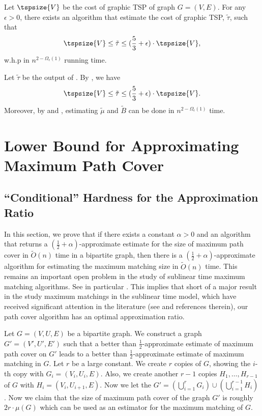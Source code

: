 \begin{theorem}\label{thm: graphic-tsp3}
Let $\tspsize{V}$ be the cost of graphic TSP of graph $G = (V, E)$. For any $\epsilon > 0$, there exists an algorithm that estimate the cost of graphic TSP, $\tilde{\tau}$, such that
$$
\tspsize{V} \leq \tilde{\tau} \leq (\frac{5}{3} + \epsilon) \cdot \tspsize{V},
$$
w.h.p in $n^{2-\Omega_\epsilon(1)}$ running time. \vspace{3px}
\end{theorem}
\begin{myproof}
Let $\tilde{\tau}$ be the output of . By , we have 
$$
\tspsize{V} \leq \tilde{\tau} \leq (\frac{5}{3} + \epsilon) \cdot \tspsize{V}.
$$
Moreover, by  and , estimating $\tilde{\mu}$ and $\tilde{B}$ can be done in $n^{2-\Omega_\epsilon(1)}$ time.
\end{myproof}





\section{Lower Bound for Approximating Maximum Path Cover}\label{sec:lowerbound}


\subsection{``Conditional'' Hardness for the Approximation Ratio}
In this section, we prove that if there exists a constant $\alpha > 0$ and an algorithm that returns a $(\frac{1}{2} + \alpha)$-approximate estimate for the size of maximum path cover in $\tilde{O}(n)$ time in a bipartite graph, then there is a $(\frac{1}{2} + \alpha)$-approximate algorithm for estimating the maximum matching size in $\tilde{O}(n)$ time. This remains an important open problem in the study of sublinear time maximum matching algorithms. See in particular \cite{BehnezhadRRS-ArXiv22}. This implies that short of a major result in the study maximum matchings in the sublinear time model, which have received significant attention in the literature (see \cite{YoshidaYI09,behnezhad2021,BehnezhadRRS-ArXiv22, behnezhadroghanirubinstein2022, sayanSublinear2022} and references therein), our path cover algorithm has an optimal approximation ratio.


Let $G = (V, U, E)$ be a bipartite graph.  We construct a graph $G' = (V', U', E')$ such that a better than $\frac{1}{2}$-approximate estimate of maximum path cover on $G'$ leads to a better than $\frac{1}{2}$-approximate estimate of maximum matching in $G$. Let $r$ be a large constant. We create $r$ copies of $G$, showing the $i$-th copy with $G_i=(V_i, U_i, E)$. Also, we create another $r-1$ copies $H_{1}, \ldots, H_{r-1}$ of $G$ with $H_i = (V_i, U_{i+1}, E)$. Now we let the $G' = (\bigcup_{i=1}^r G_i) \cup (\bigcup_{i=1}^{r-1}H_i)$. Now we claim that the size of maximum path cover of the graph $G'$ is roughly $2r\cdot \mu(G)$ which can be used as an estimator for the maximum matching of $G$.

